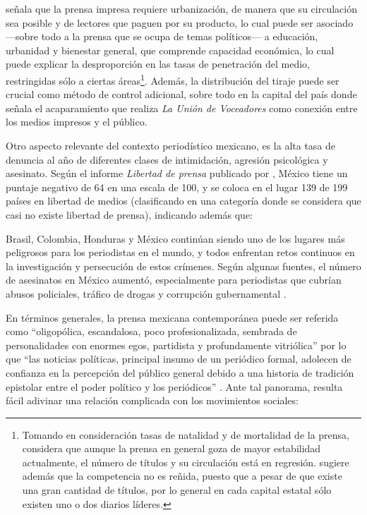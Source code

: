 \documentclass[letterpaper, 11pt]{book}
\theoremstyle{definition}
\theoremstyle{remark}
\begin{document}
\citet{2013_Garcia_PrensaMex} señala que la prensa impresa requiere urbanización, de manera que su circulación sea posible y de lectores que paguen por su producto, lo cual puede ser asociado ---sobre todo a la prensa que se ocupa de temas políticos--- a educación, urbanidad y bienestar general, que comprende capacidad económica, lo cual puede explicar la desproporción en las tasas de penetración del medio, restringidas sólo a ciertas áreas\footnote{
Tomando en consideración tasas de natalidad y de mortalidad de la prensa, considera que aunque la prensa en general goza de mayor estabilidad actualmente, el número de títulos y su circulación está en regresión. \citet{2011_Tesis_LaJornada} sugiere además que la competencia no es reñida, puesto que a pesar de que existe una gran cantidad de títulos, por lo general en cada capital estatal sólo existen uno o dos diarios líderes.}. 
Además, la distribución del tiraje puede ser crucial como método de control adicional, sobre todo en la capital del país donde \citet{2011_Tesis_LaJornada} señala el acaparamiento que realiza \emph{La Unión de Voceadores} como conexión entre los medios impresos y el público.


Otro aspecto relevante del contexto periodístico mexicano, es la alta tasa de denuncia al año de diferentes clases de intimidación, agresión psicológica y asesinato. 
Según el informe \emph{Libertad de prensa} publicado por \citet{2017_FreedomPress}, México tiene un puntaje negativo de 64 en una escala de 100, y se coloca en el lugar 139 de 199 países en libertad de medios (clasificando en una categoría donde se considera que casi no existe libertad de prensa), indicando además que: 

\begin{center}
    \begin{minipage}{0.9\linewidth}
        {\setlength{\parindent}{12pt}\small
        Brasil, Colombia, Honduras y México continúan siendo uno de los lugares más peligrosos para los periodistas en el mundo, y todos enfrentan retos continuos en la investigación y persecución de estos crímenes. 
        Según algunas fuentes, el número de asesinatos en México aumentó, especialmente para periodistas que cubrían abusos policiales, tráfico de drogas y corrupción gubernamental \normalsize \citep[21]{2017_FreedomPress}.
        }
    \end{minipage}
\end{center}


En términos generales, la prensa mexicana contemporánea puede ser referida como ``oligopólica, escandalosa, poco profesionalizada, sembrada de personalidades con enormes egos, partidista y profundamente vitriólica'' \citep[33--34]{2008_ASF_Medios} por lo que ``las noticias políticas, principal insumo de un periódico formal, adolecen de confianza en la percepción del público general debido a una historia de tradición epistolar entre el poder político y los periódicos'' \citep[131]{2013_HuertaGomez_ConcentracionMedios}. 
Ante tal panorama, resulta fácil adivinar una relación complicada con los movimientos sociales:
\end{document}
